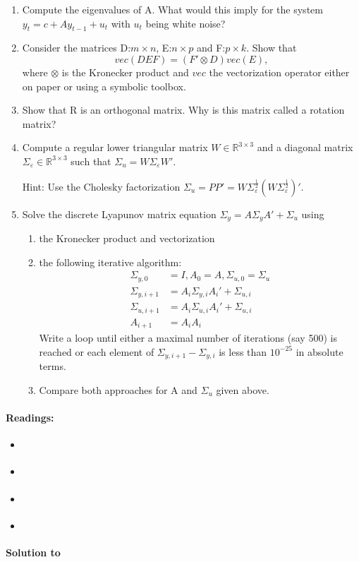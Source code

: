 \begin{enumerate}

\item Compute the eigenvalues of A.
What would this imply for the system \(y_t = c + A y_{t-1} + u_t\) with \(u_t\) being white noise?

\item Consider the matrices D:\@ \(m\times n\), E:\@ \(n\times p\) and F:\@ \(p\times k\).
Show that
\[vec(DEF)=\left(F'\otimes D\right) vec(E),\]
where \(\otimes\) is the Kronecker product and \(vec\) the vectorization operator
either on paper or using a symbolic toolbox.

\item Show that R is an orthogonal matrix. Why is this matrix called a rotation matrix?	

\item Compute a regular lower triangular matrix \(W \in \mathbb{R}^{3 \times 3}\)
and a diagonal matrix \(\Sigma_\varepsilon \in \mathbb{R}^{3 \times 3}\)
such that \(\Sigma_u=W \Sigma_\varepsilon W'\).

Hint: Use the Cholesky factorization \(\Sigma_u = P P' = W \Sigma_\varepsilon^{\frac{1}{2}}(W \Sigma_\varepsilon^{\frac{1}{2}})'\).

\item Solve the discrete Lyapunov matrix equation \(\Sigma_{y} = A\Sigma_{y}A' + \Sigma_{u}\) using
	\begin{enumerate}
	\item the Kronecker product and vectorization
	\item the following iterative algorithm:
		\begin{align*}
		\Sigma_{y,0} &= I, A_0 = A, \Sigma_{u,0} = \Sigma_{u}\\
		\Sigma_{y,i+1} &= A_i \Sigma_{y,i} A_i' + \Sigma_{u,i}\\
		\Sigma_{u,i+1} &= A_i \Sigma_{u,i} A_i' + \Sigma_{u,i}\\
		A_{i+1} &= A_i A_i
		\end{align*}
		Write a loop until either a maximal number of iterations (say 500) is reached
		or each element of \(\Sigma_{y,i+1}-\Sigma_{y,i}\) is less than \(10^{-25}\) in absolute terms.
	\item Compare both approaches for A and \(\Sigma_u\) given above.
	\end{enumerate}
\end{enumerate}

\paragraph{Readings:}
\begin{itemize}	
	\item \textcite[Ch.~4.2]{Anderson.McGrattan.Hansen.EtAl_1996_MechanicsFormingEstimating}
	\item \textcite[Ch.~6.7]{Anderson.Moore_1979_OptimalFiltering}
	\item \textcite[App.~A]{Lutkepohl_2005_NewIntroductionMultiple}
	\item \textcite[Ch.~4.10]{Uribe.Schmitt-Grohe_2017_OpenEconomyMacroeconomics}
\end{itemize}

\begin{solution}\textbf{Solution to }
\ifDisplaySolutions

\fi
\newpage
\end{solution}